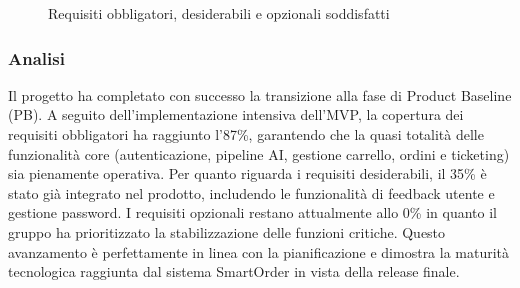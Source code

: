 \documentclass[a4paper,11pt,oneside]{scrartcl}
\begin{document}
\begin{figure}[H]
\centering


\caption{Requisiti obbligatori, desiderabili e opzionali soddisfatti}
\label{fig:requisiti_soddisfatti}
\end{figure}

\subsubsection*{Analisi}

Il progetto ha completato con successo la transizione alla fase di Product Baseline (PB). A seguito dell'implementazione intensiva dell'MVP, la copertura dei requisiti obbligatori ha raggiunto l'87\%, garantendo che la quasi totalità delle funzionalità core (autenticazione, pipeline AI, gestione carrello, ordini e ticketing) sia pienamente operativa. Per quanto riguarda i requisiti desiderabili, il 35\% è stato già integrato nel prodotto, includendo le funzionalità di feedback utente e gestione password. I requisiti opzionali restano attualmente allo 0\% in quanto il gruppo ha prioritizzato la stabilizzazione delle funzioni critiche. Questo avanzamento è perfettamente in linea con la pianificazione e dimostra la maturità tecnologica raggiunta dal sistema SmartOrder in vista della release finale.
\end{document}
